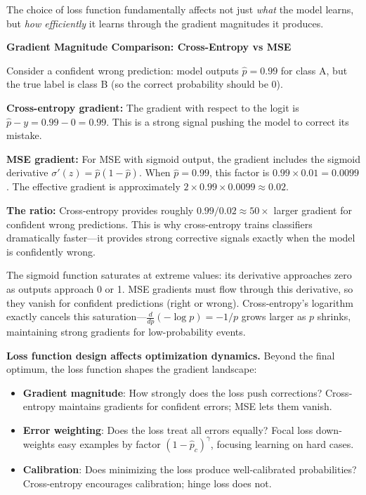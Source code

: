 \documentclass[../../main.tex]{subfiles}
\begin{document}
The choice of loss function fundamentally affects not just \textit{what} the model learns, but \textit{how efficiently} it learns through the gradient magnitudes it produces.

\begin{keyconcept}
\textbf{Gradient Magnitude Comparison: Cross-Entropy vs MSE}

Consider a confident wrong prediction: model outputs $\hat{p} = 0.99$ for class A, but the true label is class B (so the correct probability should be 0).

\textbf{Cross-entropy gradient:} The gradient with respect to the logit is $\hat{p} - y = 0.99 - 0 = 0.99$. This is a strong signal pushing the model to correct its mistake.

\textbf{MSE gradient:} For MSE with sigmoid output, the gradient includes the sigmoid derivative $\sigma'(z) = \hat{p}(1-\hat{p})$. When $\hat{p} = 0.99$, this factor is $0.99 \times 0.01 = 0.0099$. The effective gradient is approximately $2 \times 0.99 \times 0.0099 \approx 0.02$.

\textbf{The ratio:} Cross-entropy provides roughly $0.99 / 0.02 \approx 50\times$ larger gradient for confident wrong predictions. This is why cross-entropy trains classifiers dramatically faster---it provides strong corrective signals exactly when the model is confidently wrong.
\end{keyconcept}

\begin{intuition}
The sigmoid function saturates at extreme values: its derivative approaches zero as outputs approach 0 or 1. MSE gradients must flow through this derivative, so they vanish for confident predictions (right or wrong). Cross-entropy's logarithm exactly cancels this saturation---$\frac{d}{dp}(-\log p) = -1/p$ grows larger as $p$ shrinks, maintaining strong gradients for low-probability events.
\end{intuition}

\begin{principle}
\textbf{Loss function design affects optimization dynamics.} Beyond the final optimum, the loss function shapes the gradient landscape:
\begin{itemize}
    \item \textbf{Gradient magnitude}: How strongly does the loss push corrections? Cross-entropy maintains gradients for confident errors; MSE lets them vanish.
    \item \textbf{Error weighting}: Does the loss treat all errors equally? Focal loss down-weights easy examples by factor $(1-\hat{p}_c)^\gamma$, focusing learning on hard cases.
    \item \textbf{Calibration}: Does minimizing the loss produce well-calibrated probabilities? Cross-entropy encourages calibration; hinge loss does not.
\end{itemize}
\end{principle}
\end{document}
